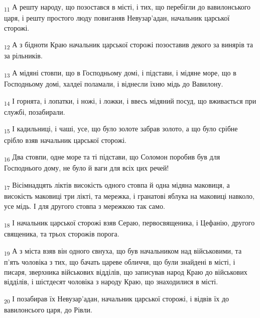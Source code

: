 \begin{tcolorbox}
\textsubscript{11} А решту народу, що позостався в місті, і тих, що перебігли до вавилонського царя, і решту простого люду повиганяв Невузар'адан, начальник царської сторожі.
\end{tcolorbox}
\begin{tcolorbox}
\textsubscript{12} А з бідноти Краю начальник царської сторожі позоставив декого за винярів та за рільників.
\end{tcolorbox}
\begin{tcolorbox}
\textsubscript{13} А мідяні стовпи, що в Господньому домі, і підстави, і мідяне море, що в Господньому домі, халдеї поламали, і віднесли їхню мідь до Вавилону.
\end{tcolorbox}
\begin{tcolorbox}
\textsubscript{14} І горнята, і лопатки, і ножі, і ложки, і ввесь мідяний посуд, що вживається при службі, позабирали.
\end{tcolorbox}
\begin{tcolorbox}
\textsubscript{15} І кадильниці, і чаші, усе, що було золоте забрав золото, а що було срібне срібло взяв начальник царської сторожі.
\end{tcolorbox}
\begin{tcolorbox}
\textsubscript{16} Два стовпи, одне море та ті підстави, що Соломон поробив був для Господнього дому, не було й ваги для всіх цих речей!
\end{tcolorbox}
\begin{tcolorbox}
\textsubscript{17} Вісімнадцять ліктів високість одного стовпа й одна мідяна маковиця, а високість маковиці три лікті, та мережка, і гранатові яблука на маковиці навколо, усе мідь. І для другого стовпа з мережкою так само.
\end{tcolorbox}
\begin{tcolorbox}
\textsubscript{18} І начальник царської сторожі взяв Сераю, первосвященика, і Цефанію, другого священика, та трьох сторожів порога.
\end{tcolorbox}
\begin{tcolorbox}
\textsubscript{19} А з міста взяв він одного євнуха, що був начальником над військовими, та п'ять чоловіка з тих, що бачать цареве обличчя, що були знайдені в місті, і писаря, зверхника військових відділів, що записував народ Краю до військових відділів, і шістдесят чоловіка з народу Краю, що знаходилися в місті.
\end{tcolorbox}
\begin{tcolorbox}
\textsubscript{20} І позабирав їх Невузар'адан, начальник царської сторожі, і відвів їх до вавилонсього царя, до Рівли.
\end{tcolorbox}
